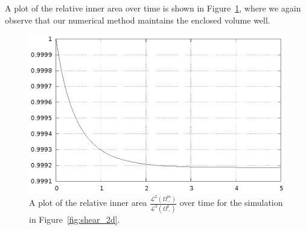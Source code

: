 A plot of the relative inner area over time is shown in
Figure~\ref{fig:shear_2d_bulk_inner_volume}, where we again observe that our
numerical method maintains the enclosed volume well.
\begin{figure}[htbp]
\centering
\includegraphics[width=.45\textwidth]
{figures/stokes/2d_shear_bulk_inner_volume.ps}
\caption[Stokes 2d shear flow inner area]
{A plot of the relative inner area
$\frac{\mathcal{L}^2(\Omega^m_-)}{\mathcal{L}^2(\Omega^0_-)}$
over time for the simulation in Figure~\ref{fig:shear_2d}.}
\label{fig:shear_2d_bulk_inner_volume}
\end{figure}

